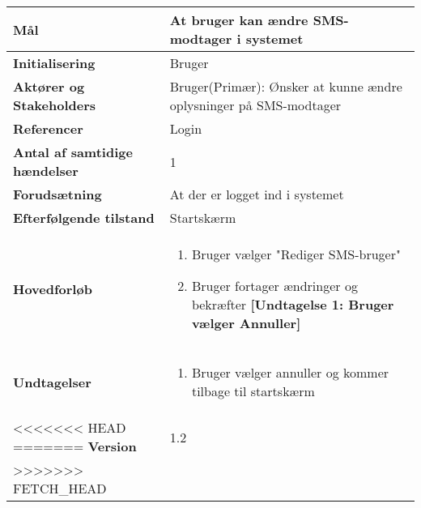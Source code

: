 \begin{table}[H] \centering
\begin{tabular}{|p{6cm}|p{8cm}|}
	\hline
\textbf{Mål} &
At bruger kan ændre SMS-modtager i systemet\\\hline

\textbf{Initialisering} &
  Bruger \\\hline
 
\textbf{Aktører og Stakeholders} &
Bruger(Primær): Ønsker at kunne ændre oplysninger på SMS-modtager  \\\hline

\textbf{Referencer} &
Login  \\\hline

\textbf{Antal af samtidige hændelser} &
1  \\\hline

\textbf{Forudsætning} &
At der er logget ind i systemet  \\\hline

\textbf{Efterfølgende tilstand} &
Startskærm  \\\hline

\textbf{Hovedforløb} &
\begin{enumerate}

\item Bruger vælger "Rediger SMS-bruger"
\item Bruger fortager ændringer og bekræfter \newline
\textbf{[Undtagelse 1: Bruger vælger Annuller]}

\end{enumerate}   
 \\\hline
 
\textbf{Undtagelser}
&\begin{enumerate}[label= \ref{UC8und1}a.]
\item Bruger vælger annuller og kommer tilbage til startskærm
\end{enumerate}
 \\\hline
 
<<<<<<< HEAD
=======
		\textbf{Version}		&1.2 \\\hline
>>>>>>> FETCH_HEAD
	\end{tabular}
	\label{UC6} 
\end{table}
